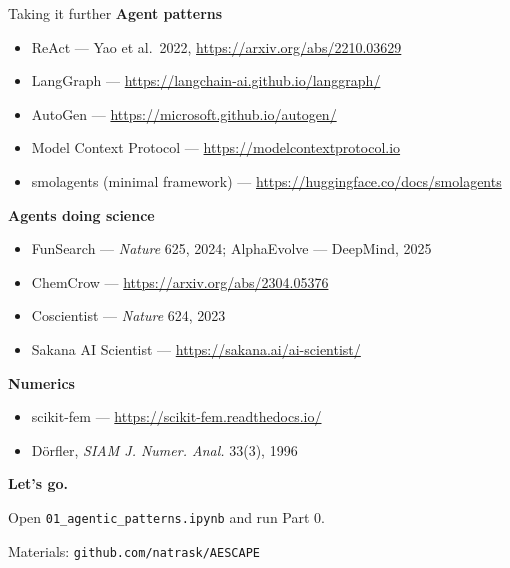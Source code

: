\documentclass[aspectratio=169,10pt]{beamer}
\newcommand{\code}[1]{\texttt{\small #1}}
\begin{document}
\begin{frame}{Taking it further}
\textbf{Agent patterns}
\begin{itemize}\itemsep1pt\small
  \item ReAct --- Yao et al.\ 2022, \url{https://arxiv.org/abs/2210.03629}
  \item LangGraph --- \url{https://langchain-ai.github.io/langgraph/}
  \item AutoGen --- \url{https://microsoft.github.io/autogen/}
  \item Model Context Protocol --- \url{https://modelcontextprotocol.io}
  \item smolagents (minimal framework) --- \url{https://huggingface.co/docs/smolagents}
\end{itemize}

\vspace{0.5em}
\textbf{Agents doing science}
\begin{itemize}\itemsep1pt\small
  \item FunSearch --- \emph{Nature} 625, 2024; AlphaEvolve --- DeepMind, 2025
  \item ChemCrow --- \url{https://arxiv.org/abs/2304.05376}
  \item Coscientist --- \emph{Nature} 624, 2023
  \item Sakana AI Scientist --- \url{https://sakana.ai/ai-scientist/}
\end{itemize}

\vspace{0.5em}
\textbf{Numerics}
\begin{itemize}\itemsep1pt\small
  \item scikit-fem --- \url{https://scikit-fem.readthedocs.io/}
  \item Dörfler, \emph{SIAM J. Numer. Anal.} 33(3), 1996
\end{itemize}
\end{frame}

\begin{frame}[plain]
\begin{center}
\vspace{2em}
{\Huge\bfseries Let's go.}

\vspace{1.5em}
{\large Open \code{01\_agentic\_patterns.ipynb} and run Part 0.}

\vspace{3em}
{\small\color{gray} Materials: \code{github.com/natrask/AESCAPE}}
\end{center}
\end{frame}
\end{document}

